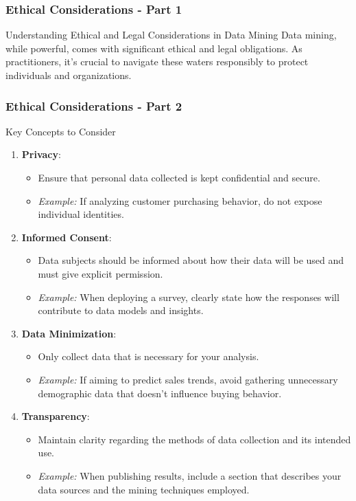 \documentclass{beamer}
\begin{document}
\begin{frame}[fragile]
    \frametitle{Ethical Considerations - Part 1}
    \begin{block}{Understanding Ethical and Legal Considerations in Data Mining}
        Data mining, while powerful, comes with significant ethical and legal obligations. As practitioners, it’s crucial to navigate these waters responsibly to protect individuals and organizations.
    \end{block}
\end{frame}

\begin{frame}[fragile]
    \frametitle{Ethical Considerations - Part 2}
    \begin{block}{Key Concepts to Consider}
        \begin{enumerate}
            \item \textbf{Privacy}:
            \begin{itemize}
                \item Ensure that personal data collected is kept confidential and secure.
                \item \textit{Example:} If analyzing customer purchasing behavior, do not expose individual identities.
            \end{itemize}
    
            \item \textbf{Informed Consent}:
            \begin{itemize}
                \item Data subjects should be informed about how their data will be used and must give explicit permission.
                \item \textit{Example:} When deploying a survey, clearly state how the responses will contribute to data models and insights.
            \end{itemize}
    
            \item \textbf{Data Minimization}:
            \begin{itemize}
                \item Only collect data that is necessary for your analysis.
                \item \textit{Example:} If aiming to predict sales trends, avoid gathering unnecessary demographic data that doesn’t influence buying behavior.
            \end{itemize}
    
            \item \textbf{Transparency}:
            \begin{itemize}
                \item Maintain clarity regarding the methods of data collection and its intended use.
                \item \textit{Example:} When publishing results, include a section that describes your data sources and the mining techniques employed.
            \end{itemize}
    

\end{enumerate}
\end{block}
\end{frame}
\end{document}
